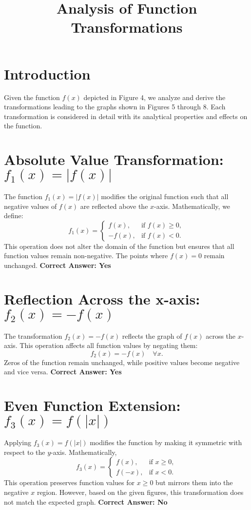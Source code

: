 \documentclass{article}
\begin{document}
\title{Analysis of Function Transformations}
\author{}
\date{}
\maketitle

\section{Introduction}
Given the function $f(x)$ depicted in Figure 4, we analyze and derive the transformations leading to the graphs shown in Figures 5 through 8. Each transformation is considered in detail with its analytical properties and effects on the function.

\section{Absolute Value Transformation: $f_1(x) = |f(x)|$}
The function $f_1(x) = |f(x)|$ modifies the original function such that all negative values of $f(x)$ are reflected above the $x$-axis. Mathematically, we define:
\[
f_1(x) = \begin{cases} 
    f(x), & \text{if } f(x) \geq 0, \\
    -f(x), & \text{if } f(x) < 0.
\end{cases}
\]
This operation does not alter the domain of the function but ensures that all function values remain non-negative. The points where $f(x) = 0$ remain unchanged.\newline
\textbf{Correct Answer: Yes}

\section{Reflection Across the x-axis: $f_2(x) = -f(x)$}
The transformation $f_2(x) = -f(x)$ reflects the graph of $f(x)$ across the $x$-axis. This operation affects all function values by negating them:
\[
f_2(x) = -f(x) \quad \forall x.
\]
Zeros of the function remain unchanged, while positive values become negative and vice versa.\newline
\textbf{Correct Answer: Yes}

\section{Even Function Extension: $f_3(x) = f(|x|)$}
Applying $f_3(x) = f(|x|)$ modifies the function by making it symmetric with respect to the $y$-axis. Mathematically,
\[
f_3(x) = \begin{cases} 
    f(x), & \text{if } x \geq 0, \\
    f(-x), & \text{if } x < 0.
\end{cases}
\]
This operation preserves function values for $x \geq 0$ but mirrors them into the negative $x$ region. However, based on the given figures, this transformation does not match the expected graph.\newline
\textbf{Correct Answer: No}
\end{document}
